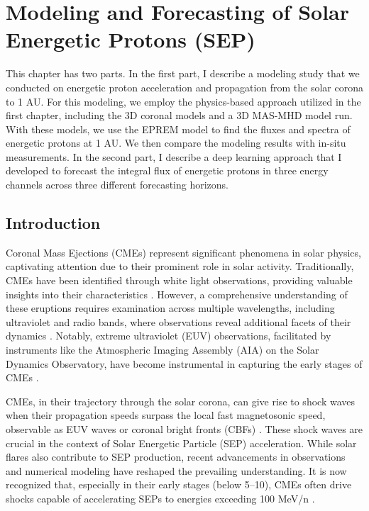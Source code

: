 \chapter{Modeling and Forecasting of Solar Energetic Protons (SEP)}
\label{chapter4}
This chapter has two parts. In the first part, I describe a modeling study that we conducted on energetic proton acceleration and propagation from the solar corona to 1 AU. For this modeling, we employ the physics-based approach utilized in the first chapter, including the 3D coronal models and a 3D MAS-MHD model run. With these models, we use the EPREM model to find the fluxes and spectra of energetic protons at 1 AU. We then compare the modeling results with in-situ measurements. In the second part, I describe a deep learning approach that I developed to forecast the integral flux of energetic protons in three energy channels across three different forecasting horizons.

\section{Introduction}
\label{sec_ch4_intro}
Coronal Mass Ejections (CMEs) represent significant phenomena in solar physics, captivating attention due to their prominent role in solar activity. Traditionally, CMEs have been identified through white light observations, providing valuable insights into their characteristics \citep{vourlidas_2003, zhang_2006, bein_2011}. However, a comprehensive understanding of these eruptions requires examination across multiple wavelengths, including ultraviolet and radio bands, where observations reveal additional facets of their dynamics \citep{bastian_2001, veronig_2010}. Notably, extreme ultraviolet (EUV) observations, facilitated by instruments like the Atmospheric Imaging Assembly (AIA) on the Solar Dynamics Observatory, have become instrumental in capturing the early stages of CMEs \citep{lemen_2012, pesnell_2012}.

CMEs, in their trajectory through the solar corona, can give rise to shock waves when their propagation speeds surpass the local fast magnetosonic speed, observable as EUV waves or coronal bright fronts (CBFs) \citep{thompson_1998, long_2011}. These shock waves are crucial in the context of Solar Energetic Particle (SEP) acceleration. While solar flares also contribute to SEP production, recent advancements in observations and numerical modeling have reshaped the prevailing understanding. It is now recognized that, especially in their early stages (below 5–10\rsun), CMEs often drive shocks capable of accelerating SEPs to energies exceeding 100 MeV/n \citep{ontiveross_2009, gopalswamy_2011, battarbee_2013, kozarev_2013, schwadron_2014, kong_2017}.

